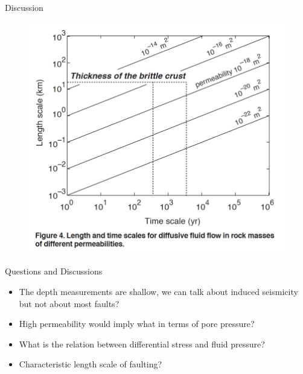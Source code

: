 \documentclass[12pt]{beamer}
\begin{document}
\begin{frame}[fragile]{Discussion}
    \begin{figure}
        \includegraphics[width=0.7\linewidth]{images/4}
    \end{figure}
\end{frame}

\begin{frame}[fragile]{Questions and Discussions}
    \begin{itemize}
        \item The depth measurements are shallow, we can talk about induced seismicity but not about most faults?
        \item High permeability would imply what in terms of pore pressure?
        \item What is the relation between differential stress and fluid pressure?
        \item Characteristic length scale of faulting?
    \end{itemize}

\end{frame}
\end{document}
